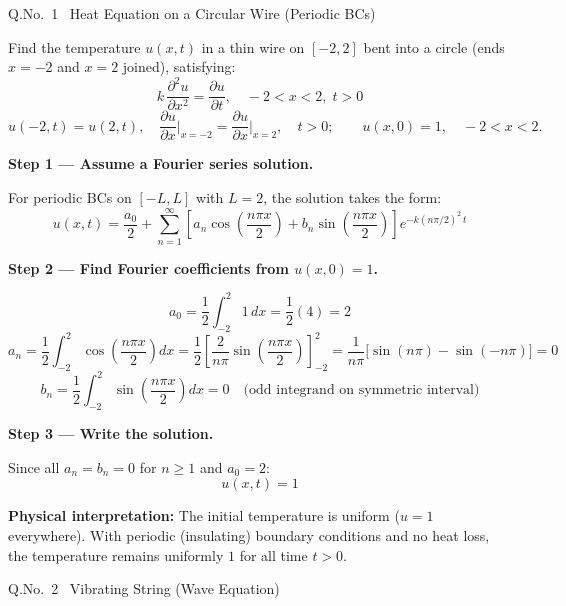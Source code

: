 \documentclass[12pt]{article}
\begin{document}
\newpage

\begin{qbox}{Q.No.\ 1 \textemdash\ Heat Equation on a Circular Wire (Periodic BCs)}
\end{qbox}

\medskip
Find the temperature $u(x,t)$ in a thin wire on $[-2,2]$ bent into a circle (ends $x=-2$ and $x=2$ joined), satisfying:
\[
  k\,\frac{\partial^2 u}{\partial x^2} = \frac{\partial u}{\partial t},\quad -2<x<2,\;t>0
\]
\[
  u(-2,t)=u(2,t),\quad \frac{\partial u}{\partial x}\Big|_{x=-2}=\frac{\partial u}{\partial x}\Big|_{x=2},\quad t>0;\qquad u(x,0)=1,\quad -2<x<2.
\]

\begin{ansbox}
\textbf{Step 1 — Assume a Fourier series solution.}

For periodic BCs on $[-L,L]$ with $L=2$, the solution takes the form:
\[
  u(x,t)=\frac{a_0}{2}+\sum_{n=1}^{\infty}\left[a_n\cos\!\left(\frac{n\pi x}{2}\right)+b_n\sin\!\left(\frac{n\pi x}{2}\right)\right]e^{-k(n\pi/2)^2\,t}
\]

\textbf{Step 2 — Find Fourier coefficients from $u(x,0)=1$.}

\[
  a_0 = \frac{1}{2}\int_{-2}^{2}1\,dx = \frac{1}{2}(4) = 2
\]
\[
  a_n = \frac{1}{2}\int_{-2}^{2}\cos\!\left(\frac{n\pi x}{2}\right)dx
      = \frac{1}{2}\left[\frac{2}{n\pi}\sin\!\left(\frac{n\pi x}{2}\right)\right]_{-2}^{2}
      = \frac{1}{n\pi}\bigl[\sin(n\pi)-\sin(-n\pi)\bigr] = 0
\]
\[
  b_n = \frac{1}{2}\int_{-2}^{2}\sin\!\left(\frac{n\pi x}{2}\right)dx = 0
  \quad\text{(odd integrand on symmetric interval)}
\]

\textbf{Step 3 — Write the solution.}

Since all $a_n=b_n=0$ for $n\geq1$ and $a_0=2$:
\[
  \boxed{u(x,t)=1}
\]

\textbf{Physical interpretation:} The initial temperature is uniform ($u=1$ everywhere). With periodic (insulating) boundary conditions and no heat loss, the temperature remains uniformly $1$ for all time $t>0$.
\end{ansbox}

\newpage

\begin{qbox}{Q.No.\ 2 \textemdash\ Vibrating String (Wave Equation)}
\end{qbox}
\end{document}
